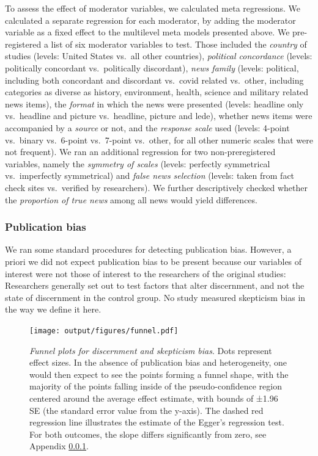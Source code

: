 \documentclass[
  man]{apa6}
\begin{document}
To assess the effect of moderator variables, we calculated meta regressions. We calculated a separate regression for each moderator, by adding the moderator variable as a fixed effect to the multilevel meta models presented above. We pre-registered a list of six moderator variables to test. Those included the \emph{country} of studies (levels: United States vs.~all other countries), \emph{political concordance} (levels: politically concordant vs.~politically discordant), \emph{news family} (levels: political, including both concordant and discordant vs.~covid related vs.~other, including categories as diverse as history, environment, health, science and military related news items), the \emph{format} in which the news were presented (levels: headline only vs.~headline and picture vs.~headline, picture and lede), whether news items were accompanied by a \emph{source} or not, and the \emph{response scale} used (levels: 4-point vs.~binary vs.~6-point vs.~7-point vs.~other, for all other numeric scales that were not frequent). We ran an additional regression for two non-preregistered variables, namely the \emph{symmetry of scales} (levels: perfectly symmetrical vs.~imperfectly symmetrical) and \emph{false news selection} (levels: taken from fact check sites vs.~verified by researchers). We further descriptively checked whether the \emph{proportion of true news} among all news would yield differences.

\subsubsection{Publication bias}\label{publication-bias}

We ran some standard procedures for detecting publication bias. However, a priori we did not expect publication bias to be present because our variables of interest were not those of interest to the researchers of the original studies: Researchers generally set out to test factors that alter discernment, and not the state of discernment in the control group. No study measured skepticism bias in the way we define it here.



\begin{figure}
\centering
\texttt{[image: output/figures/funnel.pdf]}
\caption{\label{fig:funnel}\emph{Funnel plots for discernment and skepticism bias}. Dots represent effect sizes. In the absence of publication bias and heterogeneity, one would then expect to see the points forming a funnel shape, with the majority of the points falling inside of the pseudo-confidence region centered around the average effect estimate, with bounds of ±1.96 SE (the standard error value from the y-axis). The dashed red regression line illustrates the estimate of the Egger's regression test. For both outcomes, the slope differs significantly from zero, see Appendix \ref{publication-bias}.}
\end{figure}
\end{document}
